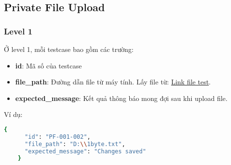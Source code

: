 \subsection{Private File Upload}
\subsubsection{Level 1}
Ở level 1, mỗi testcase bao gồm các trường:
\begin{itemize}
    \item \textbf{id}: Mã số của testcase
    \item \textbf{file\_path}: Đường dẫn file từ máy tính. Lấy file từ: \href{https://drive.google.com/drive/folders/1mAcoKv5-AXE3Vms1LvrvOoVR0mKdqAaT?usp=sharing}{Link file test}.
    \item \textbf{expected\_message}: Kết quả thông báo mong đợi sau khi upload file.
\end{itemize}
\noindent Ví dụ:
\begin{lstlisting}[language=bash, breaklines=true]
    {
      "id": "PF-001-002",
      "file_path": "D:\\1byte.txt",
      "expected_message": "Changes saved"
    }
\end{lstlisting}

